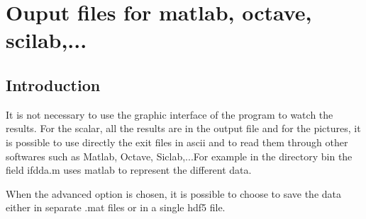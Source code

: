 \chapter{Ouput files for matlab, octave,
  scilab,...}\label{chap7}

\minitoc

\section{Introduction}

It is not necessary to use the graphic interface of the program to
watch the results. For the scalar, all the results are in the output
file and for the pictures, it is possible to use directly the exit
files in ascii and to read them through other softwares such as
Matlab, Octave, Siclab,...For example in the directory bin the field
ifdda.m uses matlab to represent the different data.


When the advanced option is chosen, it is possible to choose to save
the data either in separate .mat files or in a single hdf5 file.

